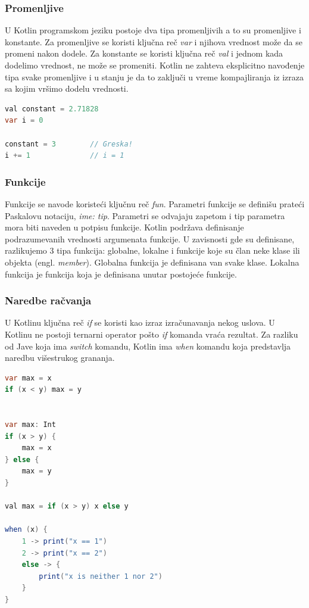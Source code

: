 \documentclass[12pt,oneside]{memoir}
\begin{document}
\subsubsection{Promenljive}
U Kotlin programskom jeziku postoje dva tipa promenljivih a to su promenljive i konstante. Za promenljive se koristi ključna reč \emph{var} i njihova vrednost može da se promeni nakon dodele. Za konstante se koristi ključna reč \emph{val} i jednom kada dodelimo vrednost, ne može se promeniti. Kotlin ne zahteva eksplicitno navođenje tipa svake promenljive i u stanju je da to zaključi u vreme kompajliranja iz izraza sa kojim vršimo dodelu vrednosti.

\begin{lstlisting}[caption={Promenljive},captionpos=t, language=Java]
val constant = 2.71828
var i = 0

constant = 3        // Greska!
i += 1              // i = 1 
\end{lstlisting}

\subsubsection{Funkcije}
Funkcije se navode koristeći ključnu reč \emph{fun}. Parametri funkcije se definišu prateći Paskalovu notaciju, \emph{ime: tip}. Parametri se odvajaju zapetom i tip parametra mora biti naveden u potpisu funkcije. Kotlin podržava definisanje podrazumevanih vrednosti argumenata funkcije. U zavisnosti gde su definisane, razlikujemo 3 tipa funkcija: globalne, lokalne i funkcije koje su član neke klase ili objekta (engl. \emph{member}). Globalna funkcija je definisana van svake klase. Lokalna funkcija je funkcija koja je definisana unutar postojeće funkcije.

\subsubsection{Naredbe račvanja}

U Kotlinu ključna reč \emph{if} se koristi kao izraz izračunavanja nekog uslova. U Kotlinu ne postoji ternarni operator pošto \emph{if} komanda vraća rezultat. Za razliku od Jave koja ima \emph{switch} komandu, Kotlin ima \emph{when} komandu koja predstavlja naredbu višestrukog grananja.

\begin{lstlisting}[caption={Naredbe grananja},captionpos=t, language=Java]
var max = x
if (x < y) max = y


var max: Int
if (x > y) {
    max = x
} else {
    max = y
}

val max = if (x > y) x else y

when (x) {
    1 -> print("x == 1")
    2 -> print("x == 2")
    else -> {
        print("x is neither 1 nor 2")
    }
}
\end{lstlisting}
\end{document}
